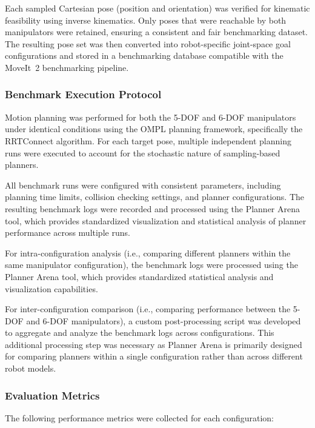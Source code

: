 \documentclass[conference]{IEEEtran}
\begin{document}
	Each sampled Cartesian pose (position and orientation) was verified for kinematic feasibility using inverse kinematics. Only poses that were reachable by both manipulators were retained, ensuring a consistent and fair benchmarking dataset. The resulting pose set was then converted into robot-specific joint-space goal configurations and stored in a benchmarking database compatible with the MoveIt~2 benchmarking pipeline.
	
	\subsubsection{Benchmark Execution Protocol}
	
	Motion planning was performed for both the 5-DOF and 6-DOF manipulators under identical conditions using the OMPL planning framework, specifically the RRTConnect algorithm. For each target pose, multiple independent planning runs were executed to account for the stochastic nature of sampling-based planners.
	
	All benchmark runs were configured with consistent parameters, including planning time limits, collision checking settings, and planner configurations. The resulting benchmark logs were recorded and processed using the Planner Arena tool, which provides standardized visualization and statistical analysis of planner performance across multiple runs.
	
	For intra-configuration analysis (i.e., comparing different planners within the same manipulator configuration), the benchmark logs were processed using the Planner Arena tool, which provides standardized statistical analysis and visualization capabilities.
	
	For inter-configuration comparison (i.e., comparing performance between the 5-DOF and 6-DOF manipulators), a custom post-processing script was developed to aggregate and analyze the benchmark logs across configurations. This additional processing step was necessary as Planner Arena is primarily designed for comparing planners within a single configuration rather than across different robot models.
	
	\subsubsection{Evaluation Metrics}
	
	The following performance metrics were collected for each configuration:
	
\end{document}
